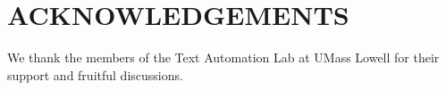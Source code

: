 \documentclass[a4paper,twoside]{article}
\begin{document}
\section*{\uppercase{Acknowledgements}}

\noindent
We thank the members of the Text Automation Lab at UMass Lowell for their support and fruitful discussions.







\vfill

{\small
}



\vfill
\end{document}
